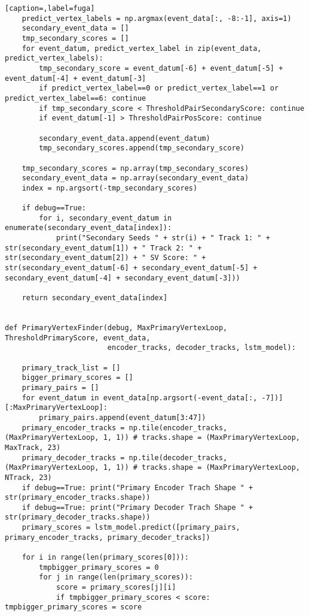 \begin{lstlisting}[caption=,label=fuga]
    predict_vertex_labels = np.argmax(event_data[:, -8:-1], axis=1)
    secondary_event_data = []
    tmp_secondary_scores = []
    for event_datum, predict_vertex_label in zip(event_data, predict_vertex_labels):
        tmp_secondary_score = event_datum[-6] + event_datum[-5] + event_datum[-4] + event_datum[-3]
        if predict_vertex_label==0 or predict_vertex_label==1 or  predict_vertex_label==6: continue
        if tmp_secondary_score < ThresholdPairSecondaryScore: continue
        if event_datum[-1] > ThresholdPairPosScore: continue
	
        secondary_event_data.append(event_datum)
        tmp_secondary_scores.append(tmp_secondary_score)
        
    tmp_secondary_scores = np.array(tmp_secondary_scores)
    secondary_event_data = np.array(secondary_event_data)
    index = np.argsort(-tmp_secondary_scores)

    if debug==True: 
        for i, secondary_event_datum in enumerate(secondary_event_data[index]):
            print("Secondary Seeds " + str(i) + " Track 1: " + str(secondary_event_datum[1]) + " Track 2: " + str(secondary_event_datum[2]) + " SV Score: " + str(secondary_event_datum[-6] + secondary_event_datum[-5] + secondary_event_datum[-4] + secondary_event_datum[-3]))
    
    return secondary_event_data[index]


def PrimaryVertexFinder(debug, MaxPrimaryVertexLoop, ThresholdPrimaryScore, event_data, 
                        encoder_tracks, decoder_tracks, lstm_model):

    primary_track_list = []
    bigger_primary_scores = []
    primary_pairs = []
    for event_datum in event_data[np.argsort(-event_data[:, -7])][:MaxPrimaryVertexLoop]:
        primary_pairs.append(event_datum[3:47])
    primary_encoder_tracks = np.tile(encoder_tracks, (MaxPrimaryVertexLoop, 1, 1)) # tracks.shape = (MaxPrimaryVertexLoop, MaxTrack, 23)
    primary_decoder_tracks = np.tile(decoder_tracks, (MaxPrimaryVertexLoop, 1, 1)) # tracks.shape = (MaxPrimaryVertexLoop, NTrack, 23)
    if debug==True: print("Primary Encoder Trach Shape " + str(primary_encoder_tracks.shape))
    if debug==True: print("Primary Decoder Trach Shape " + str(primary_decoder_tracks.shape))
    primary_scores = lstm_model.predict([primary_pairs, primary_encoder_tracks, primary_decoder_tracks])

    for i in range(len(primary_scores[0])): 
        tmpbigger_primary_scores = 0
        for j in range(len(primary_scores)):
            score = primary_scores[j][i]
            if tmpbigger_primary_scores < score: tmpbigger_primary_scores = score
        

\end{lstlisting}
